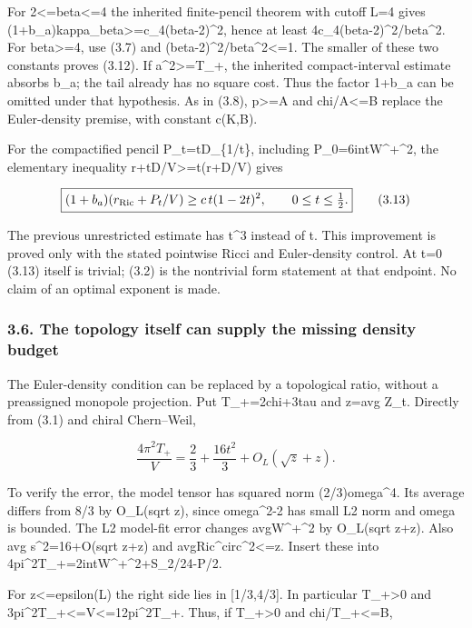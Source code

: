 \documentclass[
  10pt,
]{article}
\begin{document}
For 2\textless=beta\textless=4 the inherited finite-pencil theorem with
cutoff L=4 gives (1+b\_a)kappa\_beta\textgreater=c\_4(beta-2)\^{}2,
hence at least 4c\_4(beta-2)\^{}2/beta\^{}2. For beta\textgreater=4, use
(3.7) and (beta-2)\^{}2/beta\^{}2\textless=1. The smaller of these two
constants proves (3.12). If a\^{}2\textgreater=T\_+, the inherited
compact-interval estimate absorbs b\_a; the tail already has no square
cost. Thus the factor 1+b\_a can be omitted under that hypothesis. As in
(3.8), p\textgreater=A and chi/A\textless=B replace the Euler-density
premise, with constant c(K,B).

For the compactified pencil P\_t=tD\_\{1/t\}, including
P\_0=6int\textbar W\^{}+\textbar\^{}2, the elementary inequality
r+tD/V\textgreater=t(r+D/V) gives

\[
 \boxed{(1+b_a)(r_{\rm Ric}+P_t/V)
       \ge c\,t(1-2t)^2,\qquad0\le t\le\tfrac12.}   \tag{3.13}
\]

The previous unrestricted estimate has t\^{}3 instead of t. This
improvement is proved only with the stated pointwise Ricci and
Euler-density control. At t=0 (3.13) itself is trivial; (3.2) is the
nontrivial form statement at that endpoint. No claim of an optimal
exponent is made.

\hypertarget{the-topology-itself-can-supply-the-missing-density-budget}{%
\subsubsection{3.6. The topology itself can supply the missing density
budget}\label{the-topology-itself-can-supply-the-missing-density-budget}}

The Euler-density condition can be replaced by a topological ratio,
without a preassigned monopole projection. Put T\_+=2chi+3tau and z=avg
Z\_t. Directly from (3.1) and chiral Chern--Weil,

\[
 \frac{4\pi^2T_+}{V}
  =\frac23+\frac{16t^2}{3}+O_L(\sqrt z+z).          \tag{3.14}
\]

To verify the error, the model tensor has squared norm
(2/3)\textbar omega\textbar\^{}4. Its average differs from 8/3 by
O\_L(sqrt z), since \textbar\textbar omega\textbar\^{}2-2\textbar{} has
small L2 norm and omega is bounded. The L2 model-fit error changes
avg\textbar W\^{}+\textbar\^{}2 by O\_L(sqrt z+z). Also avg
s\^{}2=16+O(sqrt z+z) and
avg\textbar Ric\^{}circ\textbar\^{}2\textless=z. Insert these into
4pi\^{}2T\_+=2int\textbar W\^{}+\textbar\^{}2+S\_2/24-P/2.

For z\textless=epsilon(L) the right side lies in {[}1/3,4/3{]}. In
particular T\_+\textgreater0 and
3pi\^{}2T\_+\textless=V\textless=12pi\^{}2T\_+. Thus, if
T\_+\textgreater0 and chi/T\_+\textless=B,
\end{document}
